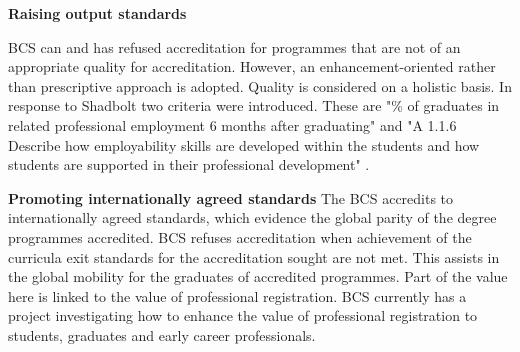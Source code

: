 \documentclass[sigconf]{acmart}
\begin{document}
{\textbf{Raising output standards}}
\begin{comment}
version 1
BCS refuses accreditation for programmes that do not meet the expected output standards or when achievement of the curricula exit standards for the accreditation sought are not met. "\% of graduates in related professional 6 months after graduating" \cite[p8]{BCS2019b} is the employability output standard applied to each programme. Departments are also requested to  "A 1.1.6 Describe how employability skills are developed within the students and how students are supported in their professional development" \cite [p3]{BCS2019b}. Both these criteria were introduced in response to Shadbolt.
\end{comment}
\begin{comment}
version 2
BCS refuses accreditation for programmes that do not meet the expected output standards. "\% of graduates in related professional 6 months after graduating" \cite[p8]{BCS2019b} is the employability output standard applied to each programme. Departments are also requested to  "A 1.1.6 Describe how employability skills are developed within the students and how students are supported in their professional development" \cite [p3]{BCS2019b}. Both these criteria were introduced in response to Shadbolt.
\end{comment}
BCS can and has refused accreditation for programmes that are not of an appropriate quality for accreditation. However, an enhancement-oriented rather than prescriptive approach is adopted. Quality is considered on a holistic basis. In response to Shadbolt two criteria were introduced. These are "\% of graduates in related professional employment 6 months after graduating"  \cite [p8]{BCS2019b} and "A 1.1.6 Describe how employability skills are developed within the students and how students are supported in their professional development" \cite [p3]{BCS2019b}.

{\textbf{Promoting internationally agreed standards}}
The BCS accredits to internationally agreed standards, which evidence the global parity of the degree programmes accredited. BCS refuses accreditation when achievement of the curricula exit standards for the accreditation sought are not met.  This assists in the global mobility for the graduates of accredited programmes. Part of the value here is linked to the value of professional registration. BCS currently has a project investigating how to enhance the value of professional registration to students, graduates and early career professionals.
\end{document}
